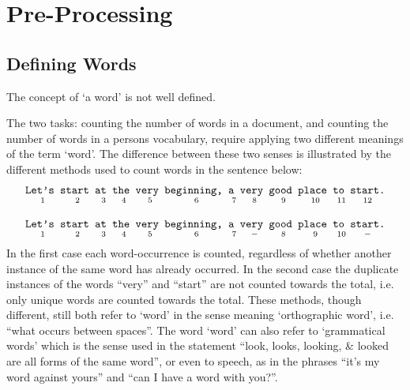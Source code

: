\chapter{Pre-Processing}\label{chp:pre-proc}
\section{Defining Words}
The concept of `a word' is not well defined.

The two tasks: counting the number of words in a document, and counting the number of words in a persons vocabulary, require applying two different meanings of the term `word'. The difference between these two senses is illustrated by the different methods used to count words in the sentence below:
\begin{align}
\underset{1}{\texttt{\vphantom{g}Let's }} \underset{2}{\texttt{\vphantom{g}start }} \underset{3}{\texttt{\vphantom{g}at }} \underset{4}{\texttt{\vphantom{g}the }} \underset{5}{\texttt{\vphantom{g}very }} \underset{6}{\texttt{\vphantom{g}beginning, }} \underset{7}{\texttt{\vphantom{g}a }} \underset{8}{\texttt{\vphantom{g}very }} \underset{9}{\texttt{\vphantom{g}good }} \underset{10}{\texttt{\vphantom{g}place }} \underset{11}{\texttt{\vphantom{g}to }} \underset{12}{\texttt{\vphantom{g}start.}}\\[9pt]
\underset{1}{\texttt{\vphantom{g}Let's }} \underset{2}{\texttt{\vphantom{g}start }} \underset{3}{\texttt{\vphantom{g}at }} \underset{4}{\texttt{\vphantom{g}the }} \underset{5}{\texttt{\vphantom{g}very }} \underset{6}{\texttt{\vphantom{g}beginning, }} \underset{7}{\texttt{\vphantom{g}a }} \underset{-}{\texttt{\vphantom{g}very }} \underset{8}{\texttt{\vphantom{g}good }} \underset{9}{\texttt{\vphantom{g}place }} \underset{10}{\texttt{\vphantom{g}to }} \underset{-}{\texttt{\vphantom{g}start.}}
\end{align}
In the first case each word-occurrence is counted, regardless of whether another instance of the same word has already occurred. In the second case the duplicate instances of the words ``very'' and ``start'' are not counted towards the total, i.e. only unique words are counted towards the total. These methods, though different, still both refer to `word' in the sense meaning `orthographic word', i.e. ``what occurs between spaces''. The word `word' can also refer to `grammatical words' which is the sense used in the statement ``look, looks, looking, \& looked are all forms of the same word'', or even to speech, as in the phrases ``it's my word against yours'' and ``can I have a word with you?''.

